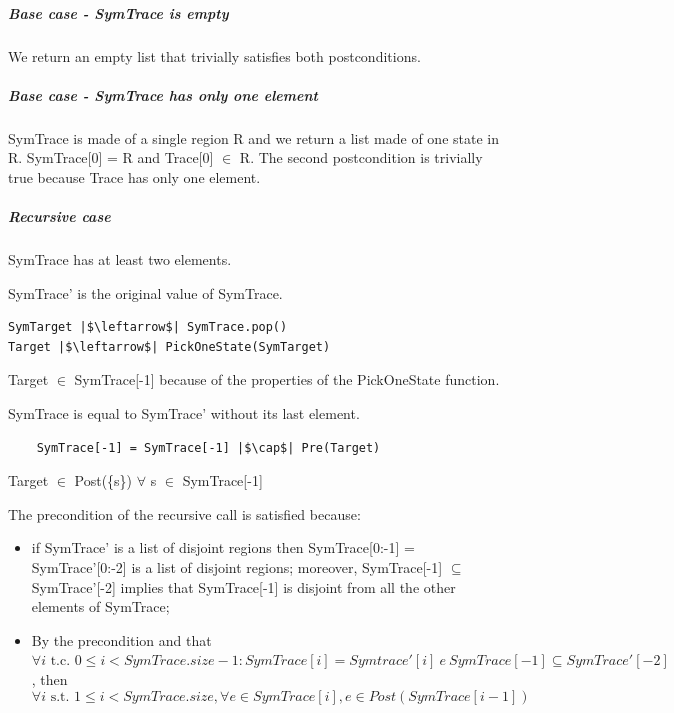 \documentclass[12pt]{article}
\begin{document}
    \subparagraph*{Base case - SymTrace is empty}
    We return an empty list that trivially satisfies both postconditions.

    \subparagraph*{Base case - SymTrace has only one element}

    SymTrace is made of a single region R and we return a list made of one state in R.
    SymTrace[0] = R and Trace[0] $\in$ R.
    The second postcondition is trivially true because Trace has only one element.

    \subparagraph*{Recursive case}
    SymTrace has at least two elements.
    
    SymTrace' is the original value of SymTrace.

    \begin{verbatim}
SymTarget |$\leftarrow$| SymTrace.pop()
Target |$\leftarrow$| PickOneState(SymTarget)
    \end{verbatim}

    Target $\in$ SymTrace[-1] because of the properties of the PickOneState function.

    SymTrace is equal to SymTrace' without its last element.
     
    \begin{verbatim}
    SymTrace[-1] = SymTrace[-1] |$\cap$| Pre(Target)
    \end{verbatim}

    Target $\in$ Post(\{s\}) $\forall$ s $\in$ SymTrace[-1]

    The precondition of the recursive call is satisfied because:
    \begin{itemize}
        \item if SymTrace' is a list of disjoint regions then SymTrace[0:-1] = SymTrace'[0:-2] is a list of disjoint regions;
        moreover, SymTrace[-1] $\subseteq$ SymTrace'[-2] implies that SymTrace[-1] is disjoint from all the other elements of SymTrace;
        \item By the precondition and that $\forall i \mbox{ t.c. } 0 \leq i < SymTrace.size - 1 : SymTrace[i] = Symtrace'[i]\ e\ SymTrace[-1] \subseteq SymTrace'[-2] $, then
        \begin{equation}
            \forall i \mbox{ s.t. } 1 \leq i < SymTrace.size, \forall e \in SymTrace[i],  e \in Post(SymTrace[i-1])
        \end{equation}
    \end{itemize}
\end{document}
